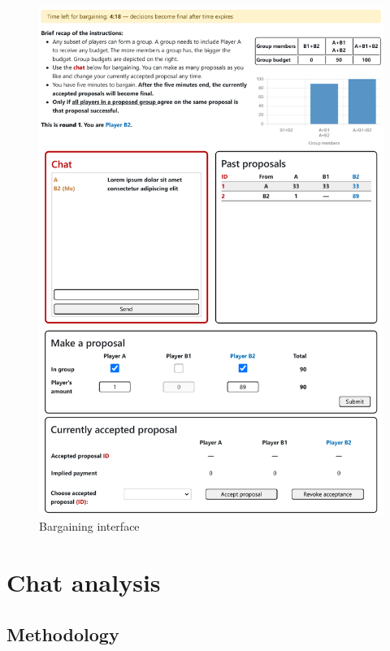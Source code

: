 \begin{figure}[!htb]
    \centering
    \includegraphics[width=.8\linewidth]{screenshots/bargaining_interface.pdf}
    \caption{Bargaining interface}
    \label{bargaining_interface}
\end{figure}


\section{Chat analysis}

\subsection{Methodology}
\label{sec:gpt_prompt}

